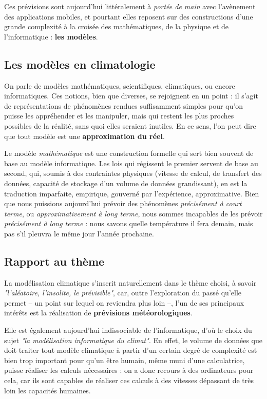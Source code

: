 \documentclass[12pt]{article}
\begin{document}
Ces prévisions sont aujourd'hui littéralement à \emph{portée de main} avec l'avènement des applications mobiles, et pourtant elles reposent sur des constructions d'une grande complexité à la croisée des mathématiques, de la physique et de l'informatique : \textbf{les modèles}.

\subsection{Les modèles en climatologie}

On parle de modèles mathématiques, scientifiques, climatiques, ou encore informatiques.
Ces notions, bien que diverses, se rejoignent en un point : il s'agit de représentations de phénomènes rendues suffisamment simples pour qu'on puisse les appréhender et les manipuler, mais qui restent les plus proches possibles de la réalité, sans quoi elles seraient inutiles.
En ce sens, l'on peut dire que tout modèle est une \textbf{approximation du réel}.

Le modèle \emph{mathématique} est une construction formelle qui sert bien souvent de base au modèle informatique.
Les lois qui régissent le premier servent de base au second, qui, soumis à des contraintes physiques (vitesse de calcul, de transfert des données, capacité de stockage d'un volume de données grandissant), en est la traduction imparfaite, empirique, gouverné par l'expérience, approximative.
Bien que nous puissions aujourd'hui prévoir des phénomènes \emph{précisément à court terme}, ou \emph{approximativement à long terme}, nous sommes incapables de les prévoir \emph{précisément à long terme} : nous savons quelle température il fera demain, mais pas s'il pleuvra le même jour l'année prochaine.


\subsection{Rapport au thème}

La modélisation climatique s'inscrit naturellement dans le thème choisi, à savoir \emph{"l'aléatoire, l'insolite, le prévisible"}, car, outre l'exploration du passé qu'elle permet -- un point sur lequel on reviendra plus loin --, l'un de ses principaux intérêts est la réalisation de \textbf{prévisions météorologiques}. %

Elle est également aujourd'hui indissociable de l'informatique, d'où le choix du sujet \emph{"la modélisation informatique du climat"}.
En effet, le volume de données que doit traiter tout modèle climatique à partir d'un certain degré de complexité est bien trop important pour qu'un être humain, même muni d'une calculatrice, puisse réaliser les calculs nécessaires : on a donc recours à des ordinateurs pour cela, car ils sont capables de réaliser ces calculs à des vitesses dépassant de très loin les capacités humaines.
\end{document}

